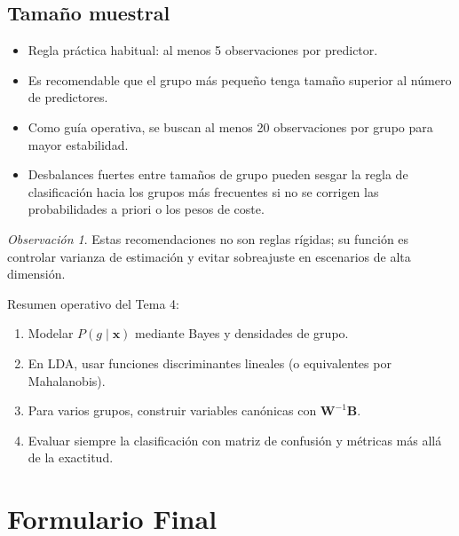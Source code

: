 \documentclass[12pt, a4paper]{article}
\theoremstyle{plain}
\theoremstyle{definition}
\theoremstyle{remark}
\newtheorem*{observacion}{Observación}
\newcommand{\mat}[1]{\mathbf{#1}}
\begin{document}
\subsection{Tamaño muestral}

\begin{itemize}
  \item Regla práctica habitual: al menos 5 observaciones por predictor.
  \item Es recomendable que el grupo más pequeño tenga tamaño superior al
        número de predictores.
  \item Como guía operativa, se buscan al menos 20 observaciones por grupo
        para mayor estabilidad.
  \item Desbalances fuertes entre tamaños de grupo pueden sesgar la regla de
        clasificación hacia los grupos más frecuentes si no se corrigen las
        probabilidades a priori o los pesos de coste.
\end{itemize}

\begin{observacion}
Estas recomendaciones no son reglas rígidas; su función es controlar varianza
de estimación y evitar sobreajuste en escenarios de alta dimensión.
\end{observacion}

\begin{mdframed}[style=resultado]
Resumen operativo del Tema 4:
\begin{enumerate}
  \item Modelar $P(g\mid\mathbf{x})$ mediante Bayes y densidades de grupo.
  \item En LDA, usar funciones discriminantes lineales (o equivalentes por
        Mahalanobis).
  \item Para varios grupos, construir variables canónicas con
        $\mat{W}^{-1}\mat{B}$.
  \item Evaluar siempre la clasificación con matriz de confusión y métricas
        más allá de la exactitud.
\end{enumerate}
\end{mdframed}

\newpage
\section*{Formulario Final}
\end{document}
